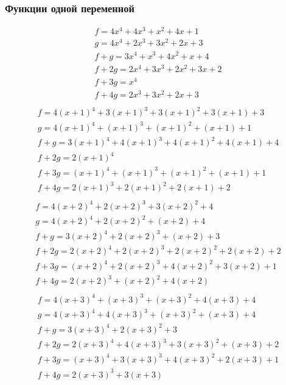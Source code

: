 \documentclass[bibliography=totoc, a4paper, 12pt]{extarticle}
\begin{document}
\subsubsection{Функции одной переменной}
$$\begin{array}{l}
f = 4x^4 + 4x^3 + x^2 + 4x + 1\\
g = 4x^4 + 2x^3 + 3x^2 + 2x + 3\\
f + g = 3x^4 + x^3 + 4x^2 + x + 4\\
f + 2g = 2x^4 + 3x^3 + 2x^2 + 3x + 2\\
f + 3g = x^4\\
f + 4g = 2x^3 + 3x^2 + 2x + 3\\
\end{array}$$
$$\begin{array}{l}
f = 4(x+1)^4 + 3(x+1)^3 + 3(x+1)^2 + 3(x+1) + 3\\
g = 4(x+1)^4 + (x+1)^3 + (x+1)^2 + (x+1) + 1\\
f + g = 3(x+1)^4 + 4(x+1)^3 + 4(x+1)^2 + 4(x+1) + 4\\
f + 2g = 2(x+1)^4\\
f + 3g = (x+1)^4 + (x+1)^3 + (x+1)^2 + (x+1) + 1\\
f + 4g = 2(x+1)^3 + 2(x+1)^2 + 2(x+1) + 2\\
\end{array}$$
$$\begin{array}{l}
f = 4(x+2)^4 + 2(x+2)^3 + 3(x+2)^2 + 4\\
g = 4(x+2)^4 + 2(x+2)^2 + (x+2) + 4\\
f + g = 3(x+2)^4 + 2(x+2)^3 + (x+2) + 3\\
f + 2g = 2(x+2)^4 + 2(x+2)^3 + 2(x+2)^2 + 2(x+2) + 2\\
f + 3g = (x+2)^4 + 2(x+2)^3 + 4(x+2)^2 + 3(x+2) + 1\\
f + 4g = 2(x+2)^3 + (x+2)^2 + 4(x+2)\\
\end{array}$$
$$\begin{array}{l}
f = 4(x+3)^4 + (x+3)^3 + (x+3)^2 + 4(x+3) + 4\\
g = 4(x+3)^4 + 4(x+3)^3 + (x+3)^2 + (x+3) + 4\\
f + g = 3(x+3)^4 + 2(x+3)^2 + 3\\
f + 2g = 2(x+3)^4 + 4(x+3)^3 + 3(x+3)^2 + (x+3) + 2\\
f + 3g = (x+3)^4 + 3(x+3)^3 + 4(x+3)^2 + 2(x+3) + 1\\
f + 4g = 2(x+3)^3 + 3(x+3)\\
\end{array}$$
\end{document}
